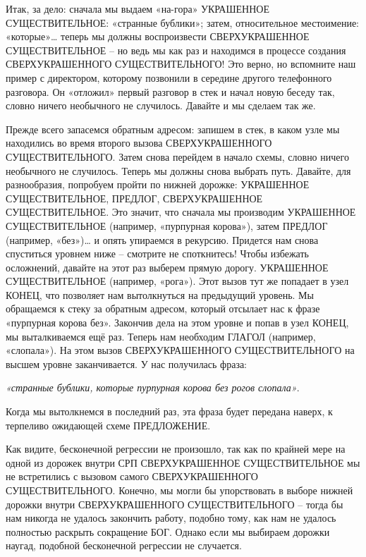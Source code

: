 \documentclass[../main.tex]{subfiles}
\begin{document}
Итак, за дело: сначала мы выдаем «на-гора» УКРАШЕННОЕ СУЩЕСТВИТЕЛЬНОЕ: «странные бублики»; затем, относительное местоимение: «которые»\ldots{} теперь мы должны воспроизвести СВЕРХУКРАШЕННОЕ СУЩЕСТВИТЕЛЬНОЕ \--- но ведь мы как раз и находимся в процессе создания СВЕРХУКРАШЕННОГО СУЩЕСТВИТЕЛЬНОГО! Это верно, но вспомните наш пример с директором, которому позвонили в середине другого телефонного разговора. Он «отложил» первый разговор в стек и начал новую беседу так, словно ничего необычного не случилось. Давайте и мы сделаем так же.

Прежде всего запасемся обратным адресом: запишем в стек, в каком узле мы находились во время второго вызова СВЕРХУКРАШЕННОГО СУЩЕСТВИТЕЛЬНОГО\@. Затем снова перейдем в начало схемы, словно ничего необычного не случилось. Теперь мы должны снова выбрать путь. Давайте, для разнообразия, попробуем пройти по нижней дорожке: УКРАШЕННОЕ СУЩЕСТВИТЕЛЬНОЕ, ПРЕДЛОГ, СВЕРХУКРАШЕННОЕ СУЩЕСТВИТЕЛЬНОЕ\@. Это значит, что сначала мы производим УКРАШЕННОЕ СУЩЕСТВИТЕЛЬНОЕ (например, «пурпурная корова»), затем ПРЕДЛОГ (например, «без»)\ldots{} и опять упираемся в рекурсию. Придется нам снова спуститься уровнем ниже \--- смотрите не споткнитесь! Чтобы избежать осложнений, давайте на этот раз выберем прямую дорогу. УКРАШЕННОЕ СУЩЕСТВИТЕЛЬНОЕ (например, «рога»). Этот вызов тут же попадает в узел КОНЕЦ, что позволяет нам вытолкнуться на предыдущий уровень. Мы обращаемся к стеку за обратным адресом, который отсылает нас к фразе «пурпурная корова без». Закончив дела на этом уровне и попав в узел КОНЕЦ, мы выталкиваемся ещё раз. Теперь нам необходим ГЛАГОЛ (например, «слопала»). На этом вызов СВЕРХУКРАШЕННОГО СУЩЕСТВИТЕЛЬНОГО на высшем уровне заканчивается. У нас получилась фраза:

\emph{«странные бублики, которые пурпурная корова без рогов слопала»}.

Когда мы вытолкнемся в последний раз, эта фраза будет передана наверх, к терпеливо ожидающей схеме ПРЕДЛОЖЕНИЕ\@.

Как видите, бесконечной регрессии не произошло, так как по крайней мере на одной из дорожек внутри СРП СВЕРХУКРАШЕННОЕ СУЩЕСТВИТЕЛЬНОЕ мы не встретились с вызовом самого СВЕРХУКРАШЕННОГО СУЩЕСТВИТЕЛЬНОГО\@. Конечно, мы могли бы упорствовать в выборе нижней дорожки внутри СВЕРХУКРАШЕННОГО СУЩЕСТВИТЕЛЬНОГО \--- тогда бы нам никогда не удалось закончить работу, подобно тому, как нам не удалось полностью раскрыть сокращение БОГ\@. Однако если мы выбираем дорожки наугад, подобной бесконечной регрессии не случается.
\end{document}
